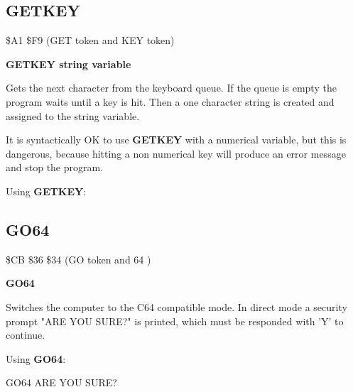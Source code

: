 \subsection{GETKEY}
\begin{description}[leftmargin=3cm,style=nextline]
\item [Token:] \$A1 \$F9 (GET token and KEY token)
\item [Format:] {\bf GETKEY string variable}
\item [Usage:] Gets the next character
               from the keyboard queue. If the queue is empty
               the program waits until a key is hit.
               Then a one character string is created
               and assigned to the string variable.

\item [Remarks:] It is syntactically OK to use {\bf GETKEY} with
               a numerical variable, but this is dangerous,
               because hitting a non numerical key will produce
               an error message and stop the program.

\item [Example:] Using {\bf GETKEY}:
\end{description}


\newpage
\subsection{GO64}
\begin{description}[leftmargin=3cm,style=nextline]
\item [Token:] \$CB \$36 \$34 (GO token and 64 )
\item [Format:] {\bf GO64}
\item [Usage:] Switches the
               computer to the C64 compatible mode.
               In direct mode a security prompt
               "ARE YOU SURE?" is printed, which must
               be responded with 'Y' to continue.

\item [Example:] Using {\bf GO64}:
\begin{screenoutput}
GO64
ARE YOU SURE?
\end{screenoutput}
\end{description}

